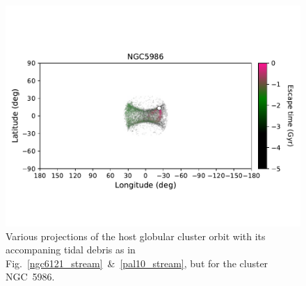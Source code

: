 \begin{figure}
\begin{center}
                    \includegraphics[clip=true, trim = 0mm 20mm 0mm 10mm, width=0.9\columnwidth]{images/PII_individual_NGC5986_NGC5986_LB_tesc.pdf}
                \end{center}
                \caption{Various projections of the host globular cluster orbit with its accompaning tidal debris as in Fig.~\ref{ngc6121_stream}~\&~\ref{pal10_stream}, but for the cluster NGC~5986.\label{ngc5986_stream}}
            \end{figure}   
            \onecolumn  
            
